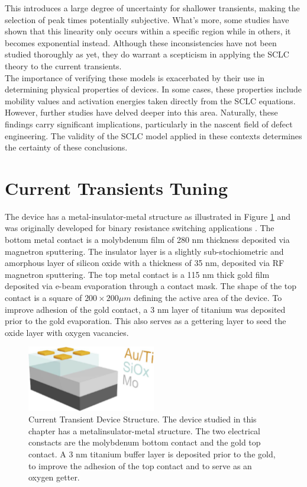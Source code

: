 \noindent This introduces a large degree of uncertainty for shallower transients, making the selection of peak times potentially subjective. What's more, some studies have shown that this linearity only occurs within a specific region while in others, it becomes exponential instead. Although these inconsistencies have not been studied thoroughly as yet, they do warrant a scepticism in applying the SCLC theory to the current transients.\\

\noindent The importance of verifying these models is exacerbated by their use in determining physical properties of devices. In some cases, these properties include mobility values and activation energies taken directly from the SCLC equations. However, further studies have delved deeper into this area. Naturally, these findings carry significant implications, particularly in the nascent field of defect engineering. The validity of the SCLC model applied in these contexts determines the certainty of these conclusions.

\section[Current Transients Tuning]{Current Transients Tuning}

The device has a metal-insulator-metal structure as illustrated in Figure \ref{fig:4c} and was originally developed for binary resistance switching applications \cite{mehonic2017intrinsic}. The bottom metal contact is a molybdenum film of 280 nm thickness deposited via magnetron sputtering. The insulator layer is a slightly sub-stochiometric and amorphous layer of silicon oxide with a thickness of 35 nm, deposited via RF magnetron sputtering. The top metal contact is a 115 nm thick gold film deposited via e-beam evaporation through a contact mask. The shape of the top contact is a square of $200 \times 200 \mu m$ defining the active area of the device. To improve adhesion of the gold contact, a 3 nm layer of titanium was deposited prior to the gold evaporation. This also serves as a gettering layer to seed the oxide layer with oxygen vacancies.

\begin{figure}[htbp!] 
    \centering    
    \includegraphics[width=0.5\textwidth]{Chapter4/Figs/c.png}
    \caption[Current Transient Device Structure]{Current Transient Device Structure. The device studied in this chapter has a metalinsulator-metal structure. The two electrical constacts are the molybdenum bottom contact and the gold top contact. A 3 nm titanium buffer layer is deposited prior to the gold, to improve the adhesion of the top contact and to serve as an oxygen getter.}
    \label{fig:4c}
\end{figure}

